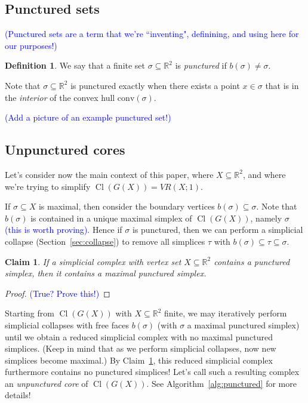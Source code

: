\documentclass[amscd, amssymb, verbatim]{amsart}[12pt]
\newcommand{\note}[1]{\textcolor{blue}{({#1})}}
\theoremstyle{plain}
\newtheorem{claim}[lemma]{Claim}
\theoremstyle{definition}
\newtheorem{definition}[lemma]{Definition}
\newcommand{\R}{\mathbb{R}}
\newcommand{\conv}{\mathrm{conv}}
\DeclareMathOperator{\cl}{Cl}
\begin{document}
\subsection{Punctured sets}

\note{Punctured sets are a term that we're ``inventing", definining, and using here for our purposes!}

\begin{definition}
We say that a finite set $\sigma\subseteq \R^2$ is \emph{punctured} if $b(\sigma)\neq \sigma$.
\end{definition}

Note that $\sigma\subseteq \R^2$ is punctured exactly when there exists a point $x\in\sigma$ that is in the \emph{interior} of the convex hull $\conv(\sigma)$.

\note{Add a picture of an example punctured set!}

\subsection{Unpunctured cores}

Let's consider now the main context of this paper, where $X\subseteq \R^2$, and where we're trying to simplify $\cl(G(X))=VR(X;1)$.

If $\sigma\subseteq X$ is maximal, then consider the boundary vertices $b(\sigma)\subseteq \sigma$.
Note that $b(\sigma)$ is contained in a unique maximal simplex of $\cl(G(X))$, namely $\sigma$ \note{this is worth proving}.
Hence if $\sigma$ is punctured, then we can perform a simplicial collapse (Section~\ref{sec:collapse}) to remove all simplices $\tau$ with $b(\sigma)\subseteq \tau\subseteq \sigma$.

\begin{claim}
\label{claim:punctured-maximal}
If a simplicial complex with vertex set $X\subseteq\R^2$ contains a punctured simplex, then it contains a maximal punctured simplex.
\end{claim}

\begin{proof}
\note{True? Prove this!}
\end{proof}

Starting from $\cl(G(X))$ with $X\subseteq\R^2$ finite, we may iteratively perform simplicial collapses with free faces $b(\sigma)$ (with $\sigma$ a maximal punctured simplex) until we obtain a reduced simplicial complex with no maximal punctured simplices.
(Keep in mind that as we perform simplicial collapses, now new simplices become maximal.)
By Claim~\ref{claim:punctured-maximal}, this reduced simplicial complex furthermore contains no punctured simplices!
Let's call such a resulting complex an \emph{unpunctured core} of $\cl(G(X))$.
See Algorithm~\ref{alg:punctured} for more details!
\end{document}
